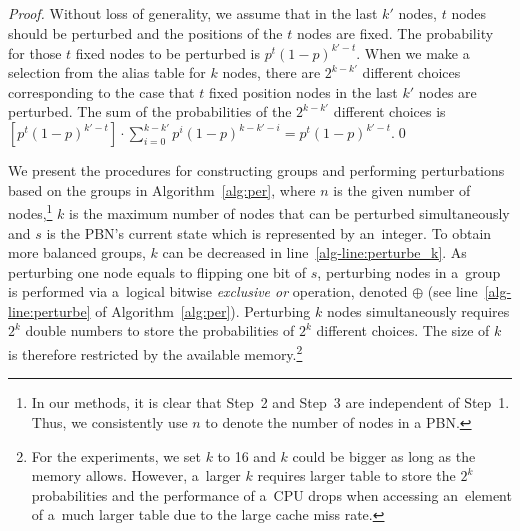 \documentclass[runningheads,a4paper]{llncs}
\begin{document}
%
\begin{proof}
Without loss of generality, we assume that in the last $k'$ nodes, $t$ nodes should be perturbed
and the positions of the $t$ nodes are fixed.
The probability for those $t$ fixed nodes to be perturbed is $p^t(1-p)^{k'-t}$.
When we make a selection from the alias table for $k$ nodes,
there are $2^{k-k'}$ different choices corresponding to the case that $t$ fixed position nodes in the last $k'$ nodes are perturbed.
The sum of the probabilities of the $2^{k-k'}$ different choices is
$[p^t(1-p)^{k'-t}]\cdot\sum_{i=0}^{k-k'}p^{i}(1-p)^{k-k'-i} = p^t(1-p)^{k'-t}$.\qed
\end{proof}

We present the procedures for constructing groups and performing perturbations based on the groups
in Algorithm~\ref{alg:per}, where
$n$ is the given number of nodes,\footnote{In our methods, it is clear that Step~2 and Step~3 are
independent of Step~1. Thus, we consistently use $n$ to denote the number of nodes in a PBN.}
$k$ is the maximum number of nodes that can be perturbed simultaneously and $s$ is the PBN's
current state which is represented by an~integer. To obtain more balanced groups, $k$ can be
decreased in line~\ref{alg-line:perturbe_k}.
As perturbing one node equals to flipping one bit of $s$,
perturbing nodes in a~group is performed via a~logical bitwise \textit{ exclusive or} operation,
denoted $\oplus$ (see line~\ref{alg-line:perturbe} of Algorithm~\ref{alg:per}).
Perturbing $k$ nodes simultaneously requires $2^k$ double numbers to store the probabilities of
$2^k$ different choices. The size of $k$ is therefore restricted by the available
memory.\footnote{ For the experiments, we set $k$ to 16 and $k$ could be bigger as long as the
memory allows. However, a~larger $k$ requires larger table to store the $2^k$ probabilities
and the performance of a~CPU drops when accessing an~element of a~much larger table
due to the large cache miss rate.}
\end{document}
